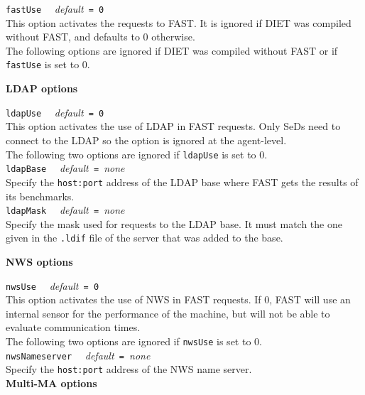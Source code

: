 \noindent
\texttt{fastUse} \ \ \emph{default}\texttt{ = 0}\\ This option
activates the requests to FAST. It is ignored if DIET was compiled
without FAST, and defaults to 0 otherwise. \\

The following options are ignored if DIET was compiled without FAST or if
\texttt{fastUse} is set to 0.

\noindent
\textbf{LDAP options}

\noindent
\texttt{ldapUse} \ \ \emph{default}\texttt{ = 0} \\
This option activates the use of LDAP in FAST requests.  Only SeDs
need to connect to the LDAP so the option is ignored at the agent-level. \\

The following two options are ignored if \texttt{ldapUse} is set to 0.
\\

\noindent
\texttt{ldapBase} \ \ \emph{default}\texttt{ = }\emph{none}\\ Specify
the \texttt{host:port} address of the LDAP base where FAST gets the
results of its benchmarks.  \\

\noindent
\texttt{ldapMask} \ \ \emph{default}\texttt{ = }\emph{none}\\ Specify
the mask used for requests to the LDAP base. It must match the one
given in the \texttt{.ldif} file of the server that was added to the
base.


\noindent
\textbf{NWS options}

\noindent
\texttt{nwsUse} \ \ \emph{default}\texttt{ = 0}\\ This option
activates the use of NWS in FAST requests. If 0, FAST will use an
internal sensor for the performance of the machine, but will not be
able to evaluate communication times.  \\

The following two options are ignored if \texttt{nwsUse} is set to 0.
\\

\noindent
\texttt{nwsNameserver} \ \ \emph{default}\texttt{ = }\emph{none}\\
Specify the \texttt{host:port} address of the NWS name server.
\\

\noindent
\textbf{Multi-MA options}

\label{sec:multimaconfig}

